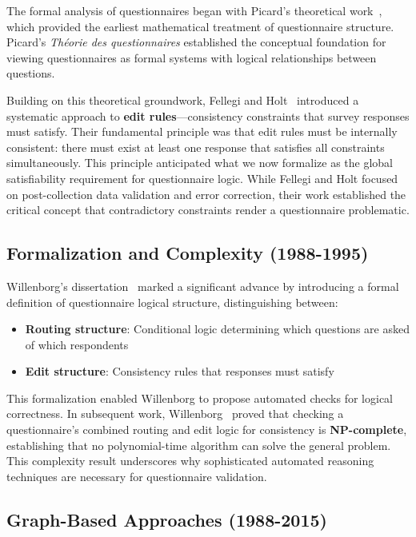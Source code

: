 The formal analysis of questionnaires began with Picard's theoretical work~\cite{picard1965theorie}, which provided the earliest mathematical treatment of questionnaire structure. Picard's \emph{Th\'eorie des questionnaires} established the conceptual foundation for viewing questionnaires as formal systems with logical relationships between questions.

Building on this theoretical groundwork, Fellegi and Holt~\cite{fellegi1976systematic} introduced a systematic approach to \textbf{edit rules}—consistency constraints that survey responses must satisfy. Their fundamental principle was that edit rules must be internally consistent: there must exist at least one response that satisfies all constraints simultaneously. This principle anticipated what we now formalize as the global satisfiability requirement for questionnaire logic. While Fellegi and Holt focused on post-collection data validation and error correction, their work established the critical concept that contradictory constraints render a questionnaire problematic.

\subsection{Formalization and Complexity (1988-1995)}

Willenborg's dissertation~\cite{willenborg1988computational} marked a significant advance by introducing a formal definition of questionnaire logical structure, distinguishing between:

\begin{itemize}
    \item \textbf{Routing structure}: Conditional logic determining which questions are asked of which respondents
    \item \textbf{Edit structure}: Consistency rules that responses must satisfy
\end{itemize}

This formalization enabled Willenborg to propose automated checks for logical correctness. In subsequent work, Willenborg~\cite{willenborg1995testing} proved that checking a questionnaire's combined routing and edit logic for consistency is \textbf{NP-complete}, establishing that no polynomial-time algorithm can solve the general problem. This complexity result underscores why sophisticated automated reasoning techniques are necessary for questionnaire validation.

\subsection{Graph-Based Approaches (1988-2015)}

